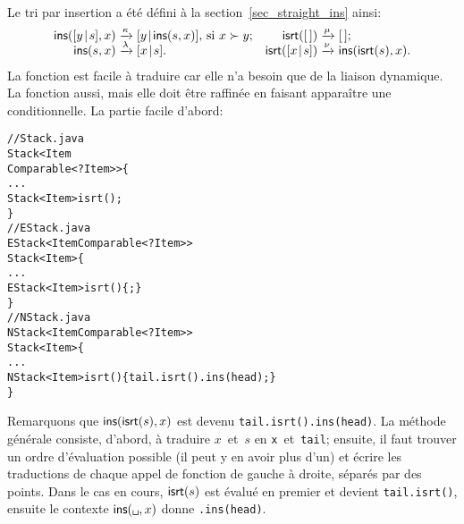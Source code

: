Le tri par insertion a été défini à la section~\vref{sec_straight_ins}
ainsi:
\begin{equation*}
\begin{array}{@{}r@{\;}l@{\;}lr@{\;}l@{\;}l@{}}
  \fun{ins}(\cons{y}{s},x)
& \xrightarrow{\smash{\kappa}}
& \cons{y}{\fun{ins}(s,x)}, \,\text{si \(x \succ y\)};
& \fun{isrt}(\el) 
& \xrightarrow{\smash{\mu}}
& \el;\\
  \fun{ins}(s,x)
& \xrightarrow{\smash{\lambda}}
& \cons{x}{s}.
& \fun{isrt}(\cons{x}{s})
& \xrightarrow{\smash{\nu}} 
& \fun{ins}(\fun{isrt}(s),x).
\end{array}
\end{equation*}
La fonction  est facile à traduire car elle n'a besoin que
de la liaison dynamique. La fonction  aussi, mais elle doit
être raffinée en faisant apparaître une conditionnelle. La partie
facile d'abord:
\begin{alltt}
// Stack.java
\public \abstractX \class Stack<Item
\hfill\extends Comparable<? \super Item>> \{
  ...
  \public \abstractX Stack<Item> isrt();
\}
// EStack.java
\public \class EStack<Item \extends Comparable<? \super Item>> 
       \extends Stack<Item> \{
  ...
  \public EStack<Item> isrt() \{ \return \this; \}
\}
// NStack.java
\public \class NStack<Item \extends Comparable<? \super Item>>
       \extends Stack<Item> \{
  ...
  \public NStack<Item> isrt() \{\return tail.isrt().ins(head);\}
\}
\end{alltt}
Remarquons que \(\textsf{ins}(\textsf{isrt}(s),x)\) est devenu
\texttt{tail.isrt().ins(head)}. La méthode générale consiste, d'abord,
à traduire \(x\)~et~\(s\) en \texttt{x}~et~\texttt{tail}; ensuite, il
faut trouver un ordre d'évaluation possible (il peut y en avoir plus
d'un) et écrire les traductions de chaque appel de fonction de gauche
à droite, séparés par des points. Dans le cas en cours,
\(\textsf{isrt}(s)\) est évalué en premier et devient
\texttt{tail.isrt()}, ensuite le contexte
\(\fun{ins}(\texttt{\textvisiblespace},x)\) donne
\texttt{\textvisiblespace.ins(head)}.

